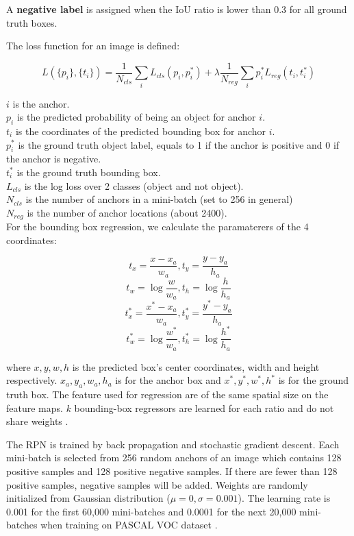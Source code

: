 \documentclass{article}
\begin{document}
A \textbf{negative label} is assigned when the IoU ratio is lower than 0.3 for all ground truth boxes. 

The loss function for an image is defined:

$$L(\{p_i\},\{t_i\}) = \dfrac{1}{N_{cls}}\sum_{i} L_{cls}(p_i, p^*_i) + \lambda \dfrac{1}{N_{reg}} \sum_i p^*_i L_{reg}(t_i, t^*_i)$$

$i$ is the anchor. \\
$p_i$ is the predicted probability of being an object for anchor $i$. \\
$t_i$ is the coordinates of the predicted bounding box for anchor $i$. \\
$p^*_i$ is the ground truth object label, equals to 1 if the anchor is positive and 0 if the anchor is negative. \\
$t^*_i$ is the ground truth bounding box. \\
$L_{cls}$ is the log loss over 2 classes (object and not object). \\
$N_{cls}$ is the number of anchors in a mini-batch (set to 256 in general) \\
$N_{reg}$ is the number of anchor locations (about 2400). \\

For the bounding box regression, we calculate the paramaterers of the 4 coordinates:

$$t_x = \dfrac{x - x_a}{w_a}, t_y = \dfrac{y - y_a}{h_a}$$
$$t_w = \log \dfrac{w}{w_a}, t_h = \log \dfrac{h}{h_a}$$
$$t^*_x = \dfrac{x^* - x_a}{w_a}, t^*_y = \dfrac{y^* - y_a}{h_a}$$
$$t^*_w = \log \dfrac{w^*}{w_a}, t^*_h = \log \dfrac{h^*}{h_a}$$

where $x, y, w, h$ is the predicted box's center coordinates, width and height respectively. $x_a, y_a, w_a, h_a$ is for the anchor box and $x^*, y^*, w^*, h^*$ is for the ground truth box. The feature used for regression are of the same spatial size on the feature maps. $k$ bounding-box regressors are learned for each ratio and do not share weights \cite{arxiv/faster-rcnn}.

The RPN is trained by back propagation and stochastic gradient descent. Each mini-batch is selected from 256 random anchors of an image which contains 128 positive samples and 128 positive negative samples. If there are fewer than 128 positive samples, negative samples will be added. Weights are randomly initialized from Gaussian distribution ($\mu = 0, \sigma = 0.001$). The learning rate is 0.001 for the first 60,000 mini-batches and 0.0001 for the next 20,000 mini-batches when training on PASCAL VOC dataset \cite{arxiv/faster-rcnn}.
\end{document}
